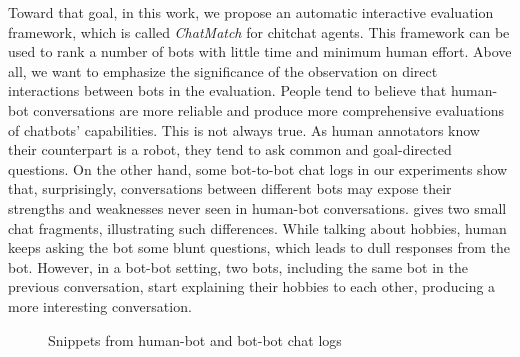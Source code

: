 Toward that goal, in this work, we propose an automatic interactive evaluation 
framework, which is called \textit{ChatMatch} for chitchat
agents. This framework can be used to rank a number of bots with little
time and minimum human effort.  Above all, we want to emphasize 
the significance of the observation on direct interactions between bots 
in the evaluation. 
People tend to believe that human-bot conversations are more reliable 
and produce more comprehensive evaluations of chatbots' capabilities. 
This is not always true. As human annotators know their counterpart is a robot, 
they tend to ask common and goal-directed questions. 
On the other hand, some bot-to-bot chat logs in our experiments show that, 
surprisingly, conversations between different bots may expose their strengths 
and weaknesses never seen in human-bot conversations. 
 gives two small chat fragments, illustrating such
differences.
While talking about hobbies, human keeps asking the bot some blunt
questions, which leads to dull responses from the bot.
However, in a bot-bot setting, two bots, including the same bot in the previous
conversation, start explaining their hobbies to each other, producing a more
interesting conversation. 

\begin{figure}[ht!]
 \centering

 
 \caption{Snippets from human-bot and bot-bot chat logs}
\label{fig:two convs}
\end{figure}

